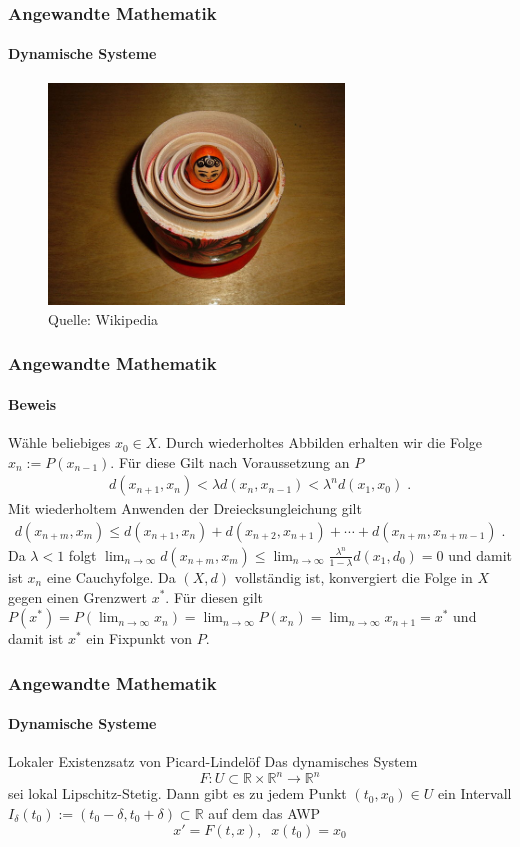 \documentclass{beamer}
\begin{document}
\begin{frame}
    \frametitle{Angewandte Mathematik}
\framesubtitle{Dynamische Systeme }
\begin{figure}[H]
      \centering
    \includegraphics[width=0.7\textwidth]{images/640px-Floral_matryoshka_set_2_smallest_doll_nested.JPG}
\caption{Quelle: Wikipedia}
\end{figure}

 \end{frame}


\begin{frame}
    \frametitle{Angewandte Mathematik}
\framesubtitle{Beweis}
Wähle beliebiges $x_0 \in X$. Durch wiederholtes Abbilden erhalten wir die Folge  $x_n:= P(x_{n-1})$. Für diese Gilt nach Voraussetzung an $P$
\begin{align*}
d(x_{n+1} , x_{n}) < \lambda d(x_{n} , x_{n-1})   < \lambda^n d(x_{1} , x_{0})  \; .
\end{align*}
Mit wiederholtem Anwenden der Dreiecksungleichung gilt 
\begin{align*}
d(x_{n + m} , x_{ m}) \leq d(x_{n+1} , x_{n})  +  d(x_{n +2} , x_{n +1}) +   \cdots   +  d(x_{n + m } , x_{n +m -1}) \; .
\end{align*}
Da $\lambda < 1$ folgt $  \lim_{n \to \infty} d(x_{n + m} , x_{ m})   \leq  \lim_{n \to \infty} \frac{\lambda^n}{1 - \lambda} d(x_{1} , d_{0}) = 0$ und damit ist $x_n$ eine Cauchyfolge.  Da $(X,d)$ vollständig ist, konvergiert die Folge in $X$ gegen einen Grenzwert $x^*$. Für diesen gilt $P(x^*) =  P (  \lim_{n \to \infty}  x_n) =  \lim_{n \to \infty} P(x_n)  =  \lim_{n \to \infty} x_{n+1} = x^*$ und damit ist $x^*$ ein Fixpunkt von $P$.

 \end{frame}

\begin{frame}
    \frametitle{Angewandte Mathematik}
\framesubtitle{Dynamische Systeme }
\begin{block}{Lokaler Existenzsatz von Picard-Lindelöf}
Das dynamisches System  $$F : U \subset \mathbb{R} \times \mathbb{R}^n \to \mathbb{R}^n$$ sei lokal Lipschitz-Stetig. 
Dann gibt es zu jedem Punkt $(t_0, x_0) \in U$ ein Intervall $I_\delta (t_0) := (t_0 - \delta, t_0 + \delta) \subset \mathbb{R}$ auf dem das AWP 
$$ x' = F(t,x), \; \; x(t_0) = x_0$$
\end{block}

 \end{frame}
\end{document}
